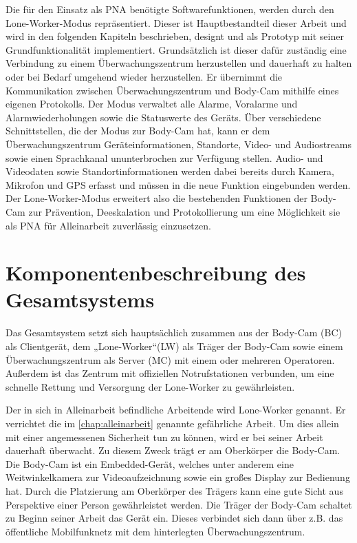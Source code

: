 \documentclass[thesis.tex]{subfiles}
\begin{document}
Die für den Einsatz als PNA benötigte Softwarefunktionen, werden durch den Lone-Worker-Modus repräsentiert.
Dieser ist Hauptbestandteil dieser Arbeit und wird in den folgenden Kapiteln beschrieben, designt und als Prototyp mit seiner Grundfunktionalität implementiert.
Grundsätzlich ist dieser dafür zuständig eine Verbindung zu einem Überwachungszentrum herzustellen und dauerhaft zu halten oder bei Bedarf umgehend wieder herzustellen.
Er übernimmt die Kommunikation zwischen Überwachungszentrum und Body-Cam mithilfe eines eigenen Protokolls.
Der Modus verwaltet alle Alarme, Voralarme und Alarmwiederholungen sowie die Statuswerte des Geräts.
Über verschiedene Schnittstellen, die der Modus zur Body-Cam hat, kann er dem Überwachungszentrum Geräteinformationen, Standorte, Video- und Audiostreams sowie einen Sprachkanal ununterbrochen zur Verfügung stellen.
Audio- und Videodaten sowie Standortinformationen werden dabei bereits durch Kamera, Mikrofon und GPS erfasst und müssen in die neue Funktion eingebunden werden.
Der Lone-Worker-Modus erweitert also die bestehenden Funktionen der Body-Cam zur Prävention, Deeskalation und Protokollierung um eine Möglichkeit sie als PNA für Alleinarbeit zuverlässig einzusetzen.

\section{Komponentenbeschreibung des Gesamtsystems}
Das Gesamtsystem setzt sich hauptsächlich zusammen aus der Body-Cam (BC) als Clientgerät, dem „Lone-Worker“(LW)
als Träger der Body-Cam sowie einem Überwachungszentrum als Server (MC) mit einem oder mehreren Operatoren.
Außerdem ist das Zentrum mit offiziellen Notrufstationen verbunden, um eine schnelle Rettung und Versorgung der Lone-Worker zu gewährleisten.

Der in sich in Alleinarbeit befindliche Arbeitende wird Lone-Worker genannt.
Er verrichtet die im \autoref{chap:alleinarbeit} genannte gefährliche Arbeit.
Um dies allein mit einer angemessenen Sicherheit tun zu können, wird er bei seiner Arbeit dauerhaft überwacht.
Zu diesem Zweck trägt er am Oberkörper die Body-Cam.
Die Body-Cam ist ein Embedded-Gerät, welches unter anderem eine Weitwinkelkamera zur Videoaufzeichnung sowie ein großes Display zur Bedienung hat.
Durch die Platzierung am Oberkörper des Trägers kann eine gute Sicht aus Perspektive einer Person gewährleistet werden.
Die Träger der Body-Cam schaltet zu Beginn seiner Arbeit das Gerät ein.
Dieses verbindet sich dann über z.B. das öffentliche Mobilfunknetz mit dem hinterlegten Überwachungszentrum.
\end{document}
